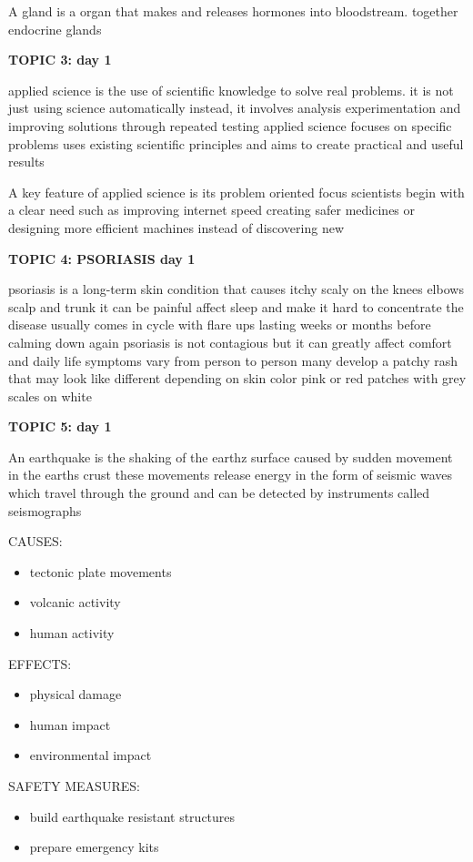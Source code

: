 {{A gland is a organ that makes and releases hormones into bloodstream. together endocrine glands

\textbf{TOPIC 3: day 1}


applied science is the use of scientific knowledge to solve real problems. it is not just using science automatically instead, it involves analysis experimentation and improving solutions through repeated testing applied science focuses on specific problems uses existing scientific principles and aims to create practical and useful results 


A key feature of applied science is its problem oriented focus scientists begin with a clear need such as improving internet speed creating safer medicines or designing more efficient machines instead of discovering new

\textbf{TOPIC 4: PSORIASIS day 1}


psoriasis is a long-term skin condition that causes itchy scaly on the knees elbows scalp and trunk it can be painful affect sleep and make it hard to concentrate the disease usually comes in cycle with flare ups lasting weeks or months before calming down again psoriasis is not contagious but it can greatly affect comfort and daily life symptoms vary from person to person many develop a patchy rash that may look like different depending on skin color pink or red patches with grey scales on white

\textbf{TOPIC 5: day 1}


An earthquake is the shaking of the earthz surface caused by sudden movement in the earths crust these movements release energy in the form of seismic waves which travel through the ground and can be detected by instruments called seismographs


CAUSES:
\begin{itemize}
    \item tectonic plate movements 
    \item volcanic activity 
    \item human activity 
\end{itemize}

EFFECTS:
\begin{itemize}
    \item physical damage 
    \item human impact 
    \item environmental impact 
\end{itemize}

SAFETY MEASURES:
\begin{itemize}
    \item build earthquake resistant structures 
    \item prepare emergency kits
\end{itemize}

}}
